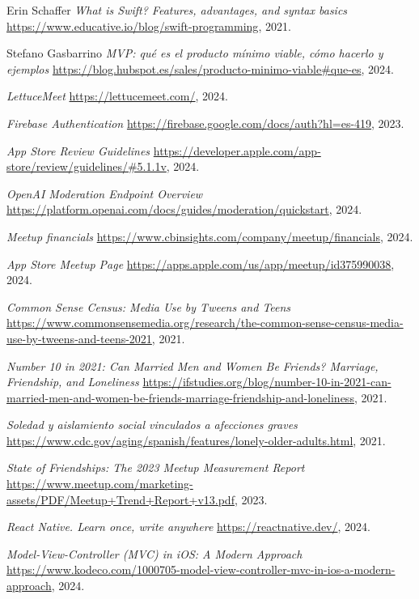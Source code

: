 
\begin{thebibliography}{9}
    Erin Schaffer
    \textit{What is Swift? Features, advantages, and syntax basics}
    \url{https://www.educative.io/blog/swift-programming}, 2021.

    Stefano Gasbarrino
    \textit{MVP: qué es el producto mínimo viable, cómo hacerlo y ejemplos}
    \url{https://blog.hubspot.es/sales/producto-minimo-viable#que-es}, 2024.

    \textit{LettuceMeet}
    \url{https://lettucemeet.com/}, 2024.

    \textit{Firebase Authentication}
    \url{https://firebase.google.com/docs/auth?hl=es-419}, 2023.

    \textit{App Store Review Guidelines}
    \url{https://developer.apple.com/app-store/review/guidelines/#5.1.1v}, 2024.

    \textit{OpenAI Moderation Endpoint Overview}
    \url{https://platform.openai.com/docs/guides/moderation/quickstart}, 2024.

    \textit{Meetup financials}
    \url{https://www.cbinsights.com/company/meetup/financials}, 2024.

    \textit{App Store Meetup Page}
    \url{https://apps.apple.com/us/app/meetup/id375990038}, 2024.

    \textit{Common Sense Census: Media Use by Tweens and Teens}
    \url{https://www.commonsensemedia.org/research/the-common-sense-census-media-use-by-tweens-and-teens-2021}, 2021.

    \textit{Number 10 in 2021: Can Married Men and Women Be Friends? Marriage, Friendship, and Loneliness}
    \url{https://ifstudies.org/blog/number-10-in-2021-can-married-men-and-women-be-friends-marriage-friendship-and-loneliness}, 2021.

    \textit{Soledad y aislamiento social vinculados a afecciones graves}
    \url{https://www.cdc.gov/aging/spanish/features/lonely-older-adults.html}, 2021.

    \textit{State of Friendships: The 2023 Meetup Measurement Report}
    \url{https://www.meetup.com/marketing-assets/PDF/Meetup+Trend+Report+v13.pdf}, 2023.

    \textit{React Native. Learn once, write anywhere}
    \url{https://reactnative.dev/}, 2024.

    \textit{Model-View-Controller (MVC) in iOS: A Modern Approach}
    \url{https://www.kodeco.com/1000705-model-view-controller-mvc-in-ios-a-modern-approach}, 2024.

\end{thebibliography}